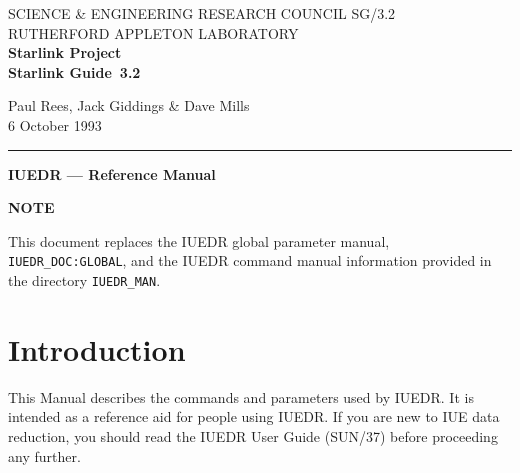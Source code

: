 \pagestyle{myheadings}

\newcommand{\stardoccategory}  {Starlink Guide}
\newcommand{\stardocinitials}  {SG}
\newcommand{\stardocnumber}    {3.2}
\newcommand{\stardocauthors}   {Paul Rees, Jack Giddings \& Dave Mills}
\newcommand{\stardocdate}      {6 October 1993}
\newcommand{\stardoctitle}     {IUEDR --- Reference Manual}

\newcommand{\stardocname}{\stardocinitials /\stardocnumber}
\markright{\stardocname}
\setlength{\textwidth}{160mm}
\setlength{\textheight}{230mm}
\setlength{\topmargin}{-2mm}
\setlength{\oddsidemargin}{0mm}
\setlength{\evensidemargin}{0mm}
\setlength{\parindent}{0mm}
\setlength{\parskip}{\medskipamount}
\setlength{\unitlength}{1mm}


\thispagestyle{empty}
SCIENCE \& ENGINEERING RESEARCH COUNCIL \hfill \stardocname\\
RUTHERFORD APPLETON LABORATORY\\
{\large\bf Starlink Project\\}
{\large\bf \stardoccategory\ \stardocnumber}
\begin{flushright}
\stardocauthors\\
\stardocdate
\end{flushright}
\vspace{-4mm}
\rule{\textwidth}{0.5mm}
\vspace{5mm}
\begin{center}
{\Large\bf \stardoctitle}
\end{center}
\vspace{5mm}

\tableofcontents
\markright{\stardocname}

\begin{center}
\vspace {10mm}
{\bf NOTE}
\end {center}

This document replaces the IUEDR global parameter manual,  {\tt
IUEDR\_DOC:GLOBAL}, and the IUEDR command manual information provided
in the directory {\tt IUEDR\_MAN}.

\newpage
\section {Introduction}

This Manual describes the commands and parameters used by IUEDR.  It
is intended as a reference aid for people using IUEDR. If you are new
to IUE data reduction, you should read the IUEDR User Guide (SUN/37)
before proceeding any further. 

